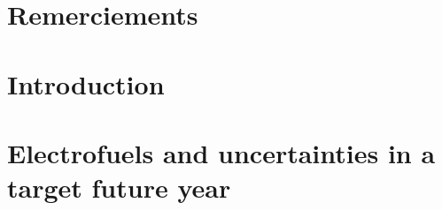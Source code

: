 \documentclass[a4paper,twoside,10pt,final]{memoir} %
\begin{document}



\frontmatter


\clearemptydoublepage


\clearemptydoublepage

\chapter*{Remerciements}

\clearemptydoublepage

\thispagestyle{empty}
\tableofcontents*
\clearemptydoublepage

\printunsrtglossaries



\mainmatter

\chapter*[Introduction]{Introduction}

\clearpage

\chapter{Electrofuels and uncertainties in a target future year}
\label{chap:chap1_electro_uq}

\clearpage
\end{document}
